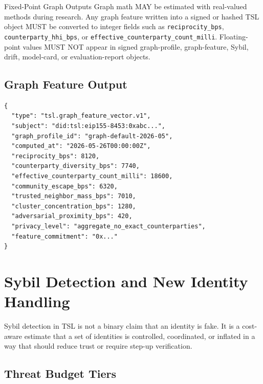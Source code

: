 \documentclass[11pt]{article}
\newcommand{\TSL}{\textsc{TSL}}
\begin{document}
\begin{principlebox}{Fixed-Point Graph Outputs}
Graph math MAY be estimated with real-valued methods during research. Any graph feature written into a signed or hashed \TSL{} object MUST be converted to integer fields such as \texttt{reciprocity\_bps}, \texttt{counterparty\_hhi\_bps}, or \texttt{effective\_counterparty\_count\_milli}. Floating-point values MUST NOT appear in signed graph-profile, graph-feature, Sybil, drift, model-card, or evaluation-report objects.
\end{principlebox}

\subsection{Graph Feature Output}

\begin{lstlisting}[style=tslcode]
{
  "type": "tsl.graph_feature_vector.v1",
  "subject": "did:tsl:eip155-8453:0xabc...",
  "graph_profile_id": "graph-default-2026-05",
  "computed_at": "2026-05-26T00:00:00Z",
  "reciprocity_bps": 8120,
  "counterparty_diversity_bps": 7740,
  "effective_counterparty_count_milli": 18600,
  "community_escape_bps": 6320,
  "trusted_neighbor_mass_bps": 7010,
  "cluster_concentration_bps": 1280,
  "adversarial_proximity_bps": 420,
  "privacy_level": "aggregate_no_exact_counterparties",
  "feature_commitment": "0x..."
}
\end{lstlisting}

\section{Sybil Detection and New Identity Handling}

Sybil detection in \TSL{} is not a binary claim that an identity is fake. It is a cost-aware estimate that a set of identities is controlled, coordinated, or inflated in a way that should reduce trust or require step-up verification.

\subsection{Threat Budget Tiers}
\end{document}
